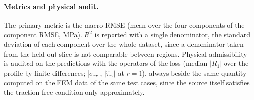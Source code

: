 \documentclass[subscriptcorrection,upint,varvw,barcolor=Goldenrod3,mathalfa=cal=euler,balance,hyphenate,french,pdf-a]{asmejour} %
\begin{document}

\paragraph{Metrics and physical audit.}
The primary metric is the macro-RMSE (mean over the four components of the
component RMSE, MPa). $R^2$ is reported with a single denominator, the standard
deviation of each component over the whole dataset, since a denominator taken
from the held-out slice is not comparable between regions.
Physical admissibility is audited on the predictions with the operators of the
loss (median $|R_1|$ over the profile by finite differences; $|\hat\sigma_{rr}|$,
$|\hat\tau_{rz}|$ at $r=1$), always beside the same quantity computed on the FEM
data of the same test cases, since the source itself satisfies the traction-free
condition only approximately.
\end{document}
